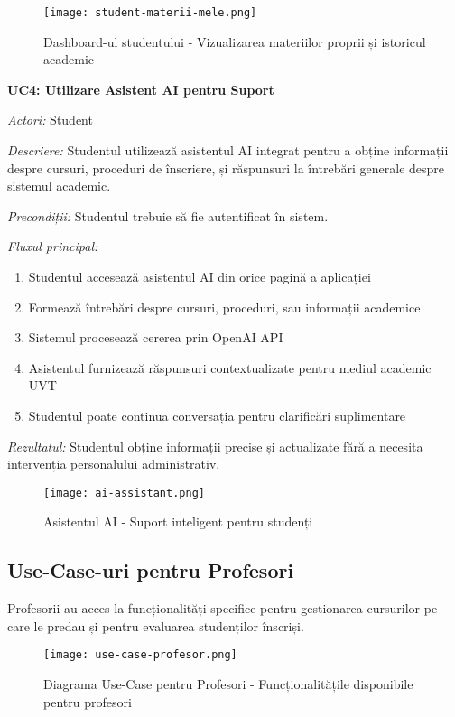 \documentclass[12pt,a4paper]{report}
\begin{document}
\begin{figure}[H]
\centering
\texttt{[image: student-materii-mele.png]}
\caption{Dashboard-ul studentului - Vizualizarea materiilor proprii și istoricul academic}
\label{fig:student-materii-mele}
\end{figure}

\textbf{UC4: Utilizare Asistent AI pentru Suport}

\textit{Actori:} Student

\textit{Descriere:} Studentul utilizează asistentul AI integrat pentru a obține informații despre cursuri, proceduri de înscriere, și răspunsuri la întrebări generale despre sistemul academic.

\textit{Precondiții:} Studentul trebuie să fie autentificat în sistem.

\textit{Fluxul principal:}
\begin{enumerate}
\item Studentul accesează asistentul AI din orice pagină a aplicației
\item Formează întrebări despre cursuri, proceduri, sau informații academice
\item Sistemul procesează cererea prin OpenAI API
\item Asistentul furnizează răspunsuri contextualizate pentru mediul academic UVT
\item Studentul poate continua conversația pentru clarificări suplimentare
\end{enumerate}

\textit{Rezultatul:} Studentul obține informații precise și actualizate fără a necesita intervenția personalului administrativ.

\begin{figure}[H]
\centering
\texttt{[image: ai-assistant.png]}
\caption{Asistentul AI - Suport inteligent pentru studenți}
\label{fig:ai-assistant}
\end{figure}

\subsection{Use-Case-uri pentru Profesori}

Profesorii au acces la funcționalități specifice pentru gestionarea cursurilor pe care le predau și pentru evaluarea studenților înscriși.

\begin{figure}[H]
\centering
\texttt{[image: use-case-profesor.png]}
\caption{Diagrama Use-Case pentru Profesori - Funcționalitățile disponibile pentru profesori}
\label{fig:use-case-profesor}
\end{figure}
\end{document}
